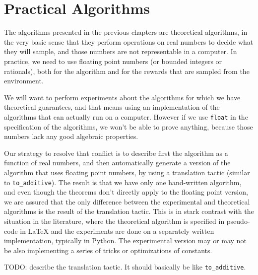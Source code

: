 \chapter{Practical Algorithms}

The algorithms presented in the previous chapters are theoretical algorithms, in the very basic sense that they perform operations on real numbers to decide what they will sample, and those numbers are not representable in a computer. In practice, we need to use floating point numbers (or bounded integers or rationals), both for the algorithm and for the rewards that are sampled from the environment.

We will want to perform experiments about the algorithms for which we have theoretical guarantees, and that means using an implementation of the algorithms that can actually run on a computer.
However if we use \texttt{float} in the specification of the algorithms, we won't be able to prove anything, because those numbers lack any good algebraic properties.

Our strategy to resolve that conflict is to describe first the algorithm as a function of real numbers, and then automatically generate a version of the algorithm that uses floating point numbers, by using a translation tactic (similar to \texttt{to\_additive}).
The result is that we have only one hand-written algorithm, and even though the theorems don't directly apply to the floating point version, we are assured that the only difference between the experimental and theoretical algorithms is the result of the translation tactic.
This is in stark contrast with the situation in the literature, where the theoretical algorithm is specified in pseudo-code in LaTeX and the experiments are done on a separately written implementation, typically in Python. The experimental version may or may not be also implementing a series of tricks or optimizations of constants.

TODO: describe the translation tactic. It should basically be like \texttt{to\_additive}.
